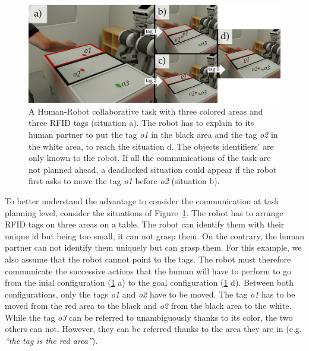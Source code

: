 \begin{figure}[t!]
\centering
\includegraphics[width=\textwidth]{figures/chapter5/intro/intro.png}
\caption{\label{fig:chap5_intro} A Human-Robot collaborative task with three colored areas and three RFID tags (situation a). The robot has to explain to its human partner to put the tag \textit{o1} in the black area and the tag \textit{o2} in the white area, to reach the situation d. The objects identifiers' are only known to the robot.
If all the communications of the task are not planned ahead, a deadlocked situation could appear if the robot first asks to move the tag \textit{o1} before \textit{o2} (situation b).}
\end{figure}

To better understand the advantage to consider the communication at task planning level, consider the situations of Figure~\ref{fig:chap5_intro}. The robot has to arrange RFID tags on three areas on a table. The robot can identify them with their unique id but being too small, it can not grasp them. On the contrary, the human partner can not identify them uniquely but can grasp them. For this example, we also assume that the robot cannot point to the tags. The robot must therefore communicate the successive actions that the human will have to perform to go from the inial configuration (\ref{fig:chap5_intro} a) to the goal configuration (\ref{fig:chap5_intro} d). Between both configurations, only the tags \textit{o1} and \textit{o2} have to be moved. The tag \textit{o1} has to be moved from the red area to the black and \textit{o2} from the black area to the white. While the tag \textit{o3} can be referred to unambiguously thanks to its color, the two others can not. However, they can be referred thanks to the area they are in (e.g. \textit{``the tag is the red area''}).

